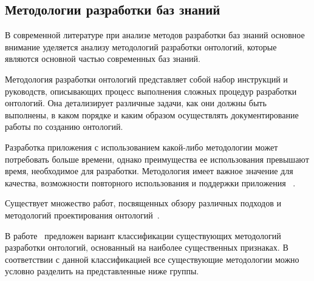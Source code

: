 \subsection{Методологии разработки баз знаний}

В современной литературе при анализе методов разработки баз знаний основное внимание уделяется анализу методологий разработки онтологий, которые являются основной частью современных баз знаний.

Методология разработки онтологий представляет собой набор инструкций и руководств, описывающих процесс выполнения сложных процедур разработки онтологий. Она детализирует различные задачи, как они должны быть выполнены, в каком порядке и каким образом осуществлять документирование работы по созданию онтологий. 

Разработка приложения с использованием какой-либо методологии может потребовать больше времени, однако преимущества ее использования превышают время, необходимое для разработки. Методология имеет важное значение для качества, возможности повторного использования и поддержки приложения ~\cite{Sainter2000}.

Существует множество работ, посвященных обзору различных подходов и методологий проектирования онтологий~\cite{Iqbal2013, Sainter2000}.

В работе~\cite{Sloboduk2013} предложен вариант классификации существующих методологий разработки онтологий, основанный на наиболее существенных признаках. В соответствии с данной классификацией все существующие методологии можно условно разделить на представленные ниже группы. 

